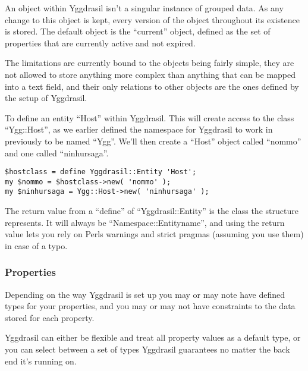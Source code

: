 \documentclass[english,a4paper]{article}
\begin{document}

An object within Yggdrasil isn't a singular instance of grouped data.
As any change to this object is kept, every version of the object
throughout its existence is stored.  The default object is the
``current'' object, defined as the set of properties that are
currently active and not expired.

The limitations are currently bound to the objects being fairly
simple, they are not allowed to store anything more complex than
anything that can be mapped into a text field, and their only
relations to other objects are the ones defined by the setup of
Yggdrasil.  

To define an entity ``Host'' within Yggdrasil.  This will create
access to the class ``Ygg::Host'', as we earlier defined the namespace
for Yggdrasil to work in previously to be named ``Ygg''.  We'll then
create a ``Host'' object called ``nommo'' and one called
``ninhursaga''.

\lstset{caption=Defining entities,label=entity}
\begin{lstlisting}
$hostclass = define Yggdrasil::Entity 'Host';
my $nommo = $hostclass->new( 'nommo' );
my $ninhursaga = Ygg::Host->new( 'ninhursaga' );
\end{lstlisting}

The return value from a ``define'' of ``Yggdrasil::Entity'' is the
class the structure represents.  It will always be
``Namespace::Entityname'', and using the return value lets you rely on
Perls warnings and strict pragmas (assuming you use them) in case of a
typo.

\subsubsection{Properties}

Depending on the way Yggdrasil is set up you may or may note have
defined types for your properties, and you may or may not have
constraints to the data stored for each property.  

Yggdrasil can either be flexible and treat all property values as a
default type, or you can select between a set of types Yggdrasil
guarantees no matter the back end it's running on.
\end{document}
